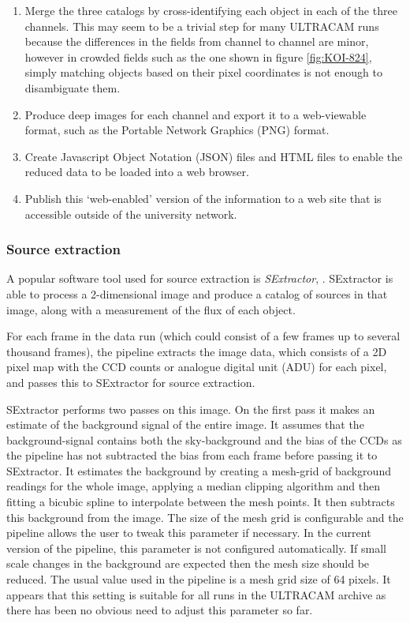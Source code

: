 \begin{enumerate}
	\item Merge the three catalogs by cross-identifying each object in each of the three channels. This may seem to be a trivial step for many ULTRACAM runs because the differences in the fields from channel to channel are minor, however in crowded fields such as the one shown in figure \ref{fig:KOI-824}, simply matching objects based on their pixel coordinates is not enough to disambiguate them.
	\item Produce deep images for each channel and export it to a web-viewable format, such as the Portable Network Graphics (PNG) format. 
	\item Create Javascript Object Notation (JSON) files and HTML files to enable the reduced data to be loaded into a web browser.
	\item Publish this `web-enabled' version of the information to a web site that is accessible outside of the university network.  
\end{enumerate}

\subsubsection{Source extraction}
A popular software tool used for source extraction is \emph{SExtractor}, \citep{bertin}. SExtractor is able to process a 2-dimensional image and produce a catalog of sources in that image, along with a measurement of the flux of each object. 

For each frame in the data run (which could consist of a few frames up to several thousand frames), the pipeline extracts the image data, which consists of a 2D pixel map with the CCD counts or analogue digital unit (ADU) for each pixel, and passes this to SExtractor for source extraction. 

SExtractor performs two passes on this image. On the first pass it makes an estimate of the background signal of the entire image. It assumes that the background-signal contains both the sky-background and the bias of the CCDs as the pipeline has not subtracted the bias from each frame before passing it to SExtractor. It estimates the background by creating a mesh-grid of background readings for the whole image, applying a median clipping algorithm and then fitting a bicubic spline to interpolate between the mesh points. It then subtracts this background from the image. The size of the mesh grid is configurable and the pipeline allows the user to tweak this parameter if necessary. In the current version of the pipeline, this parameter is not configured automatically.  If small scale changes in the background are expected then the mesh size should be reduced. The usual value used in the pipeline is a mesh grid size of 64 pixels. It appears that this setting is suitable for all runs in the ULTRACAM archive as there has been no obvious need to adjust this parameter so far. 

